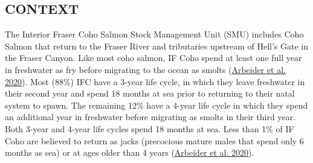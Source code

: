 \documentclass[11pt]{book}
\begin{document}
\hypertarget{context}{%
\subsection{CONTEXT}\label{context}}

The Interior Fraser Coho Salmon Stock Management Unit (SMU) includes Coho Salmon that return to the Fraser River and tributaries upstream of Hell's Gate in the Fraser Canyon. Like most coho salmon, IF Coho spend at least one full year in freshwater as fry before migrating to the ocean as smolts (\protect\hyperlink{ref-arbeiderInteriorFraserCoho2020}{Arbeider et al. 2020}). Most (88\%) IFC have a 3-year life cycle, in which they leave freshwater in their second year and spend 18 months at sea prior to returning to their natal system to spawn. The remaining 12\% have a 4-year life cycle in which they spend an additional year in freshwater before migrating as smolts in their third year. Both 3-year and 4-year life cycles spend 18 months at sea. Less than 1\% of IF Coho are believed to return as jacks (precocious mature males that spend only 6 months as sea) or at ages older than 4 years (\protect\hyperlink{ref-arbeiderInteriorFraserCoho2020}{Arbeider et al. 2020}).
\end{document}
